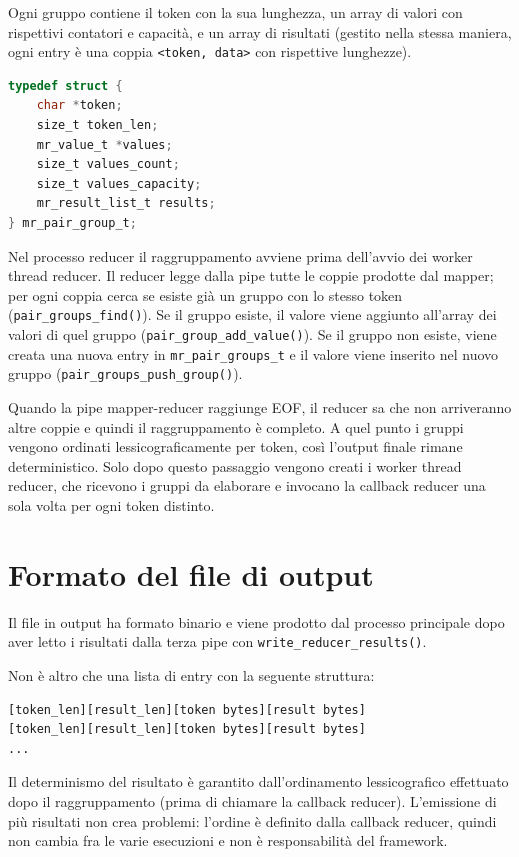 \documentclass[11pt,a4paper]{article}
\begin{document}
Ogni gruppo contiene il token con la sua lunghezza, un array di valori con rispettivi contatori e capacità, e un array di risultati (gestito nella stessa maniera, ogni entry è una coppia \texttt{<token, data>} con rispettive lunghezze).

\begin{lstlisting}[language=C]
typedef struct {
    char *token;
    size_t token_len;
    mr_value_t *values;
    size_t values_count;
    size_t values_capacity;
    mr_result_list_t results;
} mr_pair_group_t;
\end{lstlisting}

Nel processo reducer il raggruppamento avviene prima dell'avvio dei worker thread reducer. Il reducer legge dalla pipe tutte le coppie prodotte dal mapper; per ogni coppia cerca se esiste già un gruppo con lo stesso token (\texttt{pair\_groups\_find()}). Se il gruppo esiste, il valore viene aggiunto all'array dei valori di quel gruppo (\texttt{pair\_group\_add\_value()}). Se il gruppo non esiste, viene creata una nuova entry in \texttt{mr\_pair\_groups\_t} e il valore viene inserito nel nuovo gruppo (\texttt{pair\_groups\_push\_group()}).

Quando la pipe mapper-reducer raggiunge EOF, il reducer sa che non arriveranno altre coppie e quindi il raggruppamento è completo. A quel punto i gruppi vengono ordinati lessicograficamente per token, così l'output finale rimane deterministico. Solo dopo questo passaggio vengono creati i worker thread reducer, che ricevono i gruppi da elaborare e invocano la callback reducer una sola volta per ogni token distinto.

\section{Formato del file di output}

Il file in output ha formato binario e viene prodotto dal processo principale dopo aver letto i risultati dalla terza pipe con \texttt{write\_reducer\_results()}.

Non è altro che una lista di entry con la seguente struttura:

\begin{verbatim}
[token_len][result_len][token bytes][result bytes]
[token_len][result_len][token bytes][result bytes]
...
\end{verbatim}

Il determinismo del risultato è garantito dall'ordinamento lessicografico effettuato dopo il raggruppamento (prima di chiamare la callback reducer). L'emissione di più risultati non crea problemi: l'ordine è definito dalla callback reducer, quindi non cambia fra le varie esecuzioni e non è responsabilità del framework.
\end{document}
